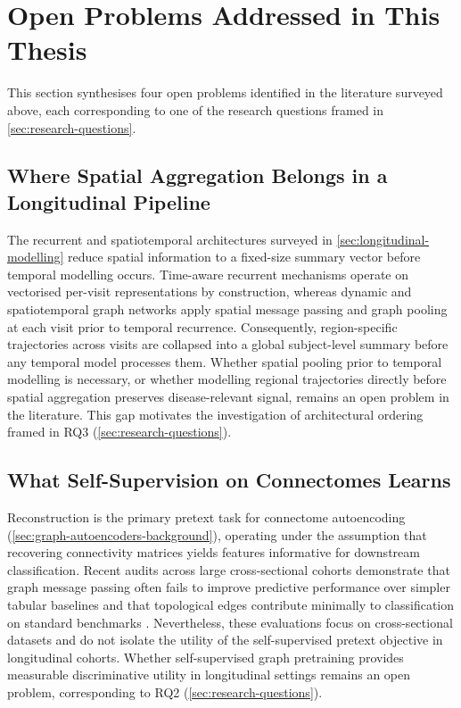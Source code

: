 \section{Open Problems Addressed in This Thesis}\label{sec:open-problems}

This section synthesises four open problems identified in the literature surveyed above,
each corresponding to one of the research questions framed in \autoref{sec:research-questions}.

\subsection{Where Spatial Aggregation Belongs in a Longitudinal Pipeline}\label{sec:gap-aggregation}

The recurrent and spatiotemporal architectures surveyed in
\autoref{sec:longitudinal-modelling} reduce spatial information to a fixed-size summary vector
before temporal modelling occurs. Time-aware recurrent mechanisms operate on vectorised
per-visit representations by construction, whereas dynamic and spatiotemporal graph networks
apply spatial message passing and graph pooling at each visit prior to temporal recurrence.
Consequently, region-specific trajectories across visits are collapsed into a global
subject-level summary before any temporal model processes them. Whether spatial pooling prior
to temporal modelling is necessary, or whether modelling regional trajectories directly before
spatial aggregation preserves disease-relevant signal, remains an open problem in the
literature. This gap motivates the investigation of architectural ordering framed in RQ3
(\autoref{sec:research-questions}).

\subsection{What Self-Supervision on Connectomes Learns}\label{sec:gap-ssl}

Reconstruction is the primary pretext task for connectome autoencoding
(\autoref{sec:graph-autoencoders-background}), operating under the assumption that recovering
connectivity matrices yields features informative for downstream classification. 
Recent audits across large cross-sectional cohorts demonstrate that graph message passing 
often fails to improve predictive performance over simpler tabular baselines \parencite{han2026rethinking} and that topological edges contribute
minimally to classification on standard benchmarks \parencite{lararangel2025limits}.
Nevertheless, these evaluations focus on cross-sectional datasets and do not isolate the
utility of the self-supervised pretext objective in longitudinal cohorts. Whether
self-supervised graph pretraining provides measurable discriminative utility in longitudinal
settings remains an open problem, corresponding to RQ2 (\autoref{sec:research-questions}).


